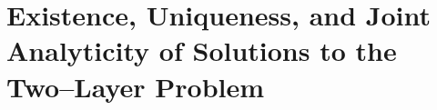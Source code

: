 \chapter{Existence, Uniqueness, and Joint Analyticity of Solutions to the Two--Layer Problem}
\label{sec:bc_and_domain}






%




%